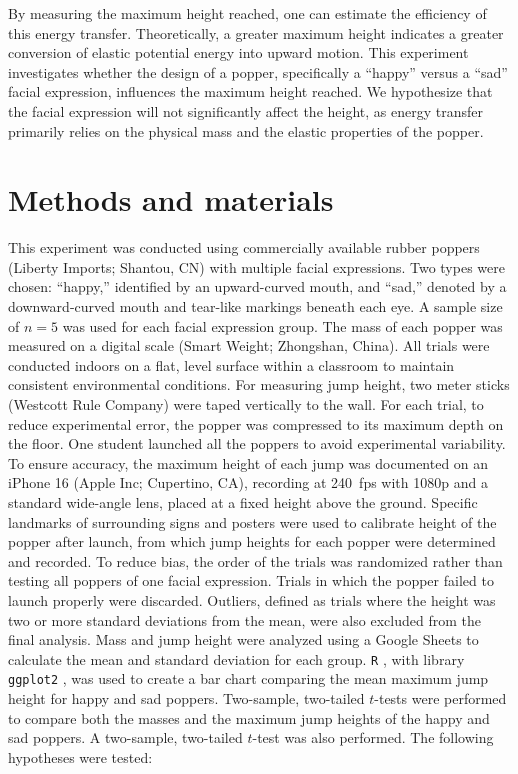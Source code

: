 \documentclass[amsmath,amssymb,aps, endfloats, linenumbers]{revtex4-2}
\begin{document}
By measuring the maximum height reached, one can estimate the efficiency of this energy transfer. Theoretically, a greater maximum height indicates a greater conversion of elastic potential energy into upward motion. This experiment investigates whether the design of a popper, specifically a ``happy'' versus a ``sad'' facial expression, influences the maximum height reached. We hypothesize that the facial expression will not significantly affect the height, as energy transfer primarily relies on the physical mass and the elastic properties of the popper.

\section{Methods and materials}
This experiment was conducted using commercially available rubber poppers (Liberty Imports; Shantou, CN) with multiple facial expressions. Two types were chosen: ``happy,'' identified by an upward-curved mouth, and ``sad,'' denoted by a downward-curved mouth and tear-like markings beneath each eye. A sample size of $n=5$ was used for each facial expression group. The mass of each popper was measured on a digital scale (Smart Weight; Zhongshan, China). All trials were conducted indoors on a flat, level surface within a classroom to maintain consistent environmental conditions. For measuring jump height, two meter sticks (Westcott Rule Company) were taped vertically to the wall. For each trial, to reduce experimental error, the popper was compressed to its maximum depth on the floor. One student launched all the poppers to avoid experimental variability. To ensure accuracy, the maximum height of each jump was documented on an iPhone 16 (Apple Inc; Cupertino, CA), recording at \qty{240}{fps} with \num{1080}p and a standard wide-angle lens, placed at a fixed height above the ground. Specific landmarks of surrounding signs and posters were used to calibrate height of the popper after launch, from which jump heights for each popper were determined and recorded. To reduce bias, the order of the trials was randomized rather than testing all poppers of one facial expression. Trials in which the popper failed to launch properly were discarded. Outliers, defined as trials where the height was two or more standard deviations from the mean, were also excluded from the final analysis. Mass and jump height were analyzed using a Google Sheets \cite{googlesheets} to calculate the mean and standard deviation for each group. \texttt{R} \cite{R}, with library \texttt{ggplot2} \cite{ggplot2}, was used to create a bar chart comparing the mean maximum jump height for happy and sad poppers. Two-sample, two-tailed $t$-tests were performed to compare both the masses and the maximum jump heights of the happy and sad poppers. A two-sample, two-tailed $t$-test was also performed. The following hypotheses were tested:
\end{document}
